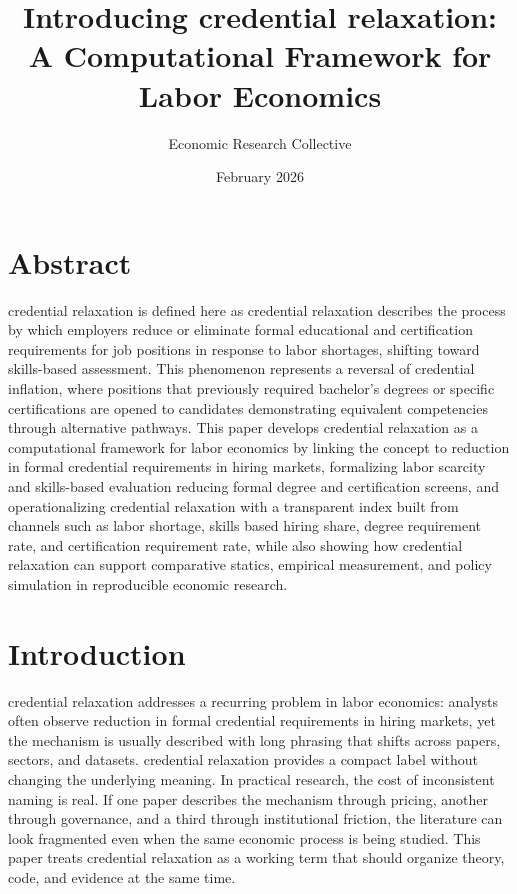 \documentclass[12pt]{article}
\title{Introducing credential relaxation: A Computational Framework for Labor Economics}
\author{Economic Research Collective}
\date{February 2026}
\begin{document}
\maketitle

\section*{Abstract}
credential relaxation is defined here as credential relaxation describes the process by which employers reduce or eliminate formal educational and certification requirements for job positions in response to labor shortages, shifting toward skills-based assessment. This phenomenon represents a reversal of credential inflation, where positions that previously required bachelor's degrees or specific certifications are opened to candidates demonstrating equivalent competencies through alternative pathways. This paper develops credential relaxation as a computational framework for labor economics by linking the concept to reduction in formal credential requirements in hiring markets, formalizing labor scarcity and skills-based evaluation reducing formal degree and certification screens, and operationalizing credential relaxation with a transparent index built from channels such as labor shortage, skills based hiring share, degree requirement rate, and certification requirement rate, while also showing how credential relaxation can support comparative statics, empirical measurement, and policy simulation in reproducible economic research.

\section{Introduction}
credential relaxation addresses a recurring problem in labor economics: analysts often observe reduction in formal credential requirements in hiring markets, yet the mechanism is usually described with long phrasing that shifts across papers, sectors, and datasets. credential relaxation provides a compact label without changing the underlying meaning. In practical research, the cost of inconsistent naming is real. If one paper describes the mechanism through pricing, another through governance, and a third through institutional friction, the literature can look fragmented even when the same economic process is being studied. This paper treats credential relaxation as a working term that should organize theory, code, and evidence at the same time.
\end{document}
